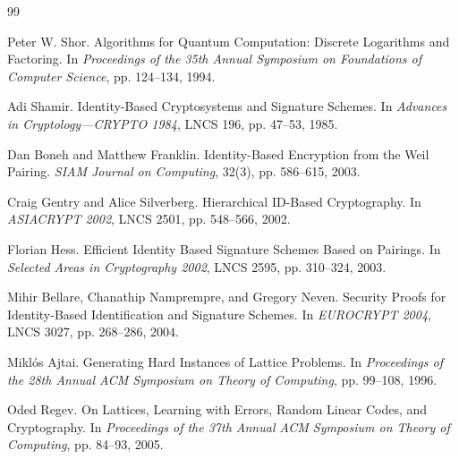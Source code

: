 \documentclass[UTF8,a4paper,12pt,oneside,openany,fontset=fandol]{ctexrep}
\newcommand{\reportheader}{全国密码技术竞赛作品设计报告}
\renewcommand{\headrulewidth}{0pt}
\renewcommand{\footrulewidth}{0pt}
\renewcommand{\headrulewidth}{0.4pt}
\renewcommand{\footrulewidth}{0pt}
\begin{document}
\clearpage
\hypersetup{pageanchor=true}
\pagestyle{frontmatter}
\begingroup
\linespread{1.15}\selectfont
\tableofcontents
\clearpage
\endgroup
{}
\fancypagestyle{plain}{
  \fancyhf{}
  \fancyhead[C]{\small\songti\reportheader}
  \fancyfoot[C]{\small\thepage}
  \renewcommand{\headrulewidth}{0.4pt}
  \renewcommand{\footrulewidth}{0pt}
}
\pagestyle{mainmatter}










\appendix


\clearpage
{}
\begin{thebibliography}{99}
\small

Peter W. Shor.
Algorithms for Quantum Computation: Discrete Logarithms and Factoring.
In \emph{Proceedings of the 35th Annual Symposium on Foundations of Computer Science},
pp. 124--134, 1994.

Adi Shamir.
Identity-Based Cryptosystems and Signature Schemes.
In \emph{Advances in Cryptology---CRYPTO 1984}, LNCS 196, pp. 47--53, 1985.

Dan Boneh and Matthew Franklin.
Identity-Based Encryption from the Weil Pairing.
\emph{SIAM Journal on Computing}, 32(3), pp. 586--615, 2003.

Craig Gentry and Alice Silverberg.
Hierarchical ID-Based Cryptography.
In \emph{ASIACRYPT 2002}, LNCS 2501, pp. 548--566, 2002.

Florian Hess.
Efficient Identity Based Signature Schemes Based on Pairings.
In \emph{Selected Areas in Cryptography 2002}, LNCS 2595, pp. 310--324, 2003.

Mihir Bellare, Chanathip Namprempre, and Gregory Neven.
Security Proofs for Identity-Based Identification and Signature Schemes.
In \emph{EUROCRYPT 2004}, LNCS 3027, pp. 268--286, 2004.

Miklós Ajtai.
Generating Hard Instances of Lattice Problems.
In \emph{Proceedings of the 28th Annual ACM Symposium on Theory of Computing},
pp. 99--108, 1996.

Oded Regev.
On Lattices, Learning with Errors, Random Linear Codes, and Cryptography.
In \emph{Proceedings of the 37th Annual ACM Symposium on Theory of Computing},
pp. 84--93, 2005.


\end{thebibliography}
\end{document}
